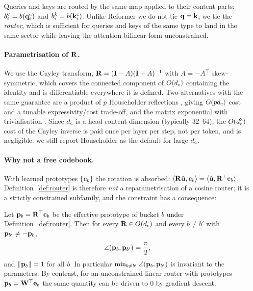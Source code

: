 Queries and keys are routed by the same map applied to their content parts: $b^q_i = b(\mathbf{q}^{\mathrm{c}}_i)$ and $b^k_i = b(\mathbf{k}^{\mathrm{c}}_i)$. Unlike Reformer we do not tie $\mathbf{q} = \mathbf{k}$; we tie the \emph{router}, which is sufficient for queries and keys of the same type to land in the same sector while leaving the attention bilinear form unconstrained.

\paragraph{Parametrisation of $\mathbf{R}$.} We use the Cayley transform, $\mathbf{R} = (\mathbf{I} - A)(\mathbf{I} + A)^{-1}$ with $A = -A^\top$ skew-symmetric, which covers the connected component of $O(d_{\mathrm{c}})$ containing the identity and is differentiable everywhere it is defined. Two alternatives with the same guarantee are a product of $p$ Householder reflections \citep{mhammedi2017householder}, giving $O(pd_{\mathrm{c}})$ cost and a tunable expressivity/cost trade-off, and the matrix exponential with trivialisation \citep{lezcano2019trivializations,arjovsky2016unitary}. Since $d_{\mathrm{c}}$ is a head content dimension (typically $32$--$64$), the $O(d_{\mathrm{c}}^3)$ cost of the Cayley inverse is paid once per layer per step, not per token, and is negligible; we still report Householder as the default for large $d_{\mathrm{c}}$.

\paragraph{Why not a free codebook.} With learned prototypes $\{\mathbf{c}_b\}$ the rotation is absorbed: $\langle \mathbf{R}\hat{\mathbf{u}}, \mathbf{c}_b\rangle = \langle \hat{\mathbf{u}}, \mathbf{R}^\top\mathbf{c}_b\rangle$. Definition~\ref{def:router} is therefore \emph{not} a reparametrisation of a cosine router; it is a strictly constrained subfamily, and the constraint has a consequence:

\begin{proposition}
\label{prop:collapse}
Let $\mathbf{p}_b = \mathbf{R}^\top \mathbf{c}_b$ be the effective prototype of bucket $b$ under Definition~\ref{def:router}. Then for every $\mathbf{R} \in O(d_{\mathrm{c}})$ and every $b \neq b'$ with $\mathbf{p}_{b'} \neq -\mathbf{p}_b$,
\begin{equation}
  \angle(\mathbf{p}_b, \mathbf{p}_{b'}) = \frac{\pi}{2},
\end{equation}
and $\|\mathbf{p}_b\| = 1$ for all $b$. In particular $\min_{b\neq b'} \angle(\mathbf{p}_b,\mathbf{p}_{b'})$ is invariant to the parameters. By contrast, for an unconstrained linear router with prototypes $\mathbf{p}_b = \mathbf{W}^\top \mathbf{e}_b$ the same quantity can be driven to $0$ by gradient descent.
\end{proposition}


